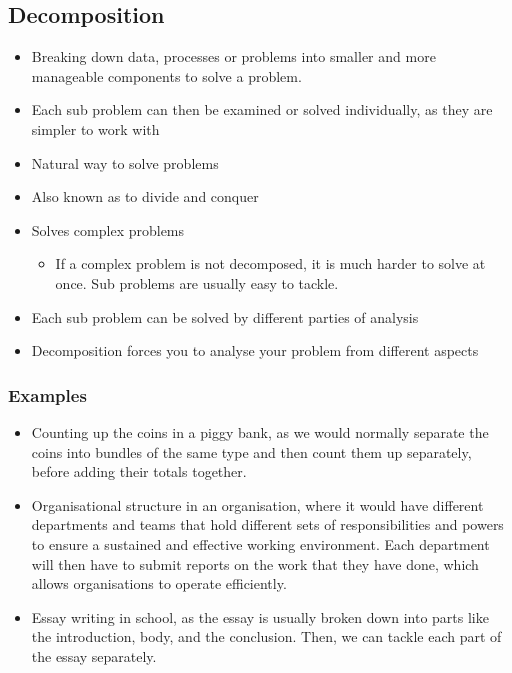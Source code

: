 \documentclass[11pt]{article}
\begin{document}
\subsection{Decomposition}
\label{sec:org104436d}
\begin{itemize}
\item Breaking down data, processes or problems into smaller and more manageable components to solve a problem.
\item Each sub problem can then be examined or solved individually, as they are simpler to work with
\item Natural way to solve problems
\item Also known as to divide and conquer
\item Solves complex problems
\begin{itemize}
\item If a complex problem is not decomposed, it is much harder to solve at once. Sub problems are usually easy to tackle.
\end{itemize}
\item Each sub problem can be solved by different parties of analysis
\item Decomposition forces you to analyse your problem from different aspects
\end{itemize}

\subsubsection{Examples}
\label{sec:org713d8e0}
\begin{itemize}
\item Counting up the coins in a piggy bank, as we would normally separate the coins into bundles of the same type and then count them up separately, before adding their totals together.
\item Organisational structure in an organisation, where it would have different departments and teams that hold different sets of responsibilities and powers to ensure a sustained and effective working environment. Each department will then have to submit reports on the work that they have done, which allows organisations to operate efficiently.
\item Essay writing in school, as the essay is usually broken down into parts like the introduction, body, and the conclusion. Then, we can tackle each part of the essay separately.
\end{itemize}

 \newpage
\end{document}

